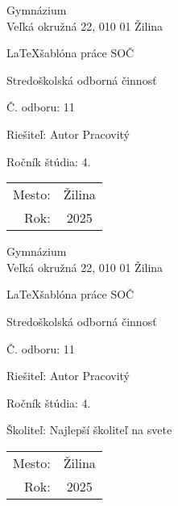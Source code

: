 \documentclass[12pt,a4paper]{article}
\def\skola{Gymnázium\\Veľká okružná 22, 010 01 Žilina}
\def\nazovprace{\LaTeX \space šablóna práce SOČ}
\def\autorprace{Autor Pracovitý}
\def\cisloodboru{11}
\def\skolitel{Najlepší školiteľ na svete}
\def\rocnikstudia{4}
\def\mesto{Žilina}
\def\rokdokoncenia{2025}
\begin{document}
\begin{titlepage}
    \centering

    \skola

    \vspace{6cm}
    \Huge \nazovprace

    \vspace{1.13cm}
    \Large Stredoškolská odborná činnosť

    \vspace{2.12cm}
    \normalsize Č. odboru: \cisloodboru

    \vfill

    \begin{minipage}{0.75\textwidth}
        Riešiteľ: \autorprace \par
        Ročník štúdia: \rocnikstudia.
    \end{minipage}
    \hfill
    \begin{minipage}{0.23\textwidth}
        \hfil %
        \begin{tabular}{rc}
            Mesto: & \mesto \\
            Rok:   & \rokdokoncenia
        \end{tabular}
    \end{minipage}
\end{titlepage}

\begin{titlepage}
    \centering
    Gymnázium \\
    Veľká okružná 22, 010 01 Žilina

    \vspace{7cm}
    \Huge \nazovprace

    \vspace{1.13cm}
    \Large Stredoškolská odborná činnosť

    \vspace{2.12cm}
    \normalsize Č. odboru: 11

    \vfill

    \begin{minipage}{0.75\textwidth}
        Riešiteľ: \autorprace \par
        Ročník štúdia: \rocnikstudia. \par
        Školiteľ: \skolitel \par
    \end{minipage}
    \hfill
    \begin{minipage}{0.23\textwidth}
        \hfil %
        \begin{tabular}{rc}
            \\
            Mesto: & \mesto \\
            Rok:   & \rokdokoncenia
        \end{tabular}
    \end{minipage}
\end{titlepage}
\end{document}
